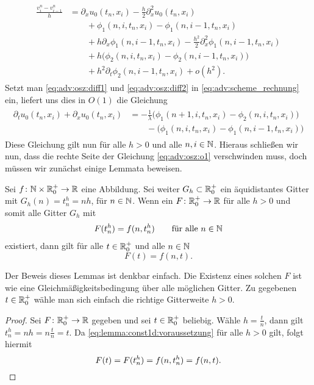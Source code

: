 {\small 
\begin{align} \label{eq:adv:osz:diff2}
\begin{split}
\frac {v^n_i - v^n_{i-1}} h 
&= \partial_x u_0(t_n, x_i) - \frac {h}{2} \partial^2_x u_0(t_n, x_i)\\
&\qquad + \phi_1(n, i, t_n, x_i) - \phi_1(n, i-1, t_n, x_i)\\
&\qquad + h \partial_x \phi_1(n, i-1, t_n, x_i) - \frac {h^2}{2} \partial^2_x \phi_1(n, i-1, t_n, x_i)\\
&\qquad + h \bigl( \phi_2(n, i, t_n, x_i) - \phi_2(n, i-1, t_n, x_i) \bigr)\\
&\qquad + h^2 \partial_t \phi_2(n, i-1, t_n, x_i) + o(h^2).
\end{split}
\end{align}
}
Setzt man \eqref{eq:adv:osz:diff1} und \eqref{eq:adv:osz:diff2} in \eqref{eq:adv:scheme_rechnung} ein, liefert uns dies in $O(1)$ die Gleichung
\begin{align}\label{eq:adv:osz:o1}
\begin{split}
\partial_t u_0(t_n, x_i) + \partial_x u_0(t_n, x_i) &= - \frac 1 \lambda \bigl( \phi_1(n+1, i, t_n, x_i) - \phi_2(n, i, t_n, x_i) \bigr)\\
&\qquad - \bigl(\phi_1(n, i, t_n, x_i) - \phi_1(n, i-1, t_n, x_i) \bigr)
\end{split}
\end{align}
Diese Gleichung gilt nun für alle $h > 0$ und alle $n, i \in \mathbb N$.
Hieraus schließen wir nun, dass die rechte Seite der Gleichung \eqref{eq:adv:osz:o1} verschwinden muss, doch müssen wir zunächst einige Lemmata beweisen.

\begin{lemma} \label{lem:adv:konstant1}
Sei $f\colon \mathbb N \times \mathbb R^+_0 \to \mathbb R$ eine Abbildung.
Sei weiter $G_h \subset \mathbb R^+_0$ ein äquidistantes Gitter mit $G_h(n) = t^h_n = n h$, für $n \in \mathbb N$.
Wenn ein $F\colon \mathbb R^+_0 \to \mathbb R$ für alle $h > 0$ und somit alle Gitter $G_h$ mit
\begin{align}\label{eq:lemma:const1d:voraussetzung}
F(t^h_n) = f(n, t^h_n) \qquad \text{für alle $n \in \mathbb N$}
\end{align}
existiert, dann gilt für alle $t \in \mathbb R^+_0$ und alle $n \in \mathbb N$
\[ F(t) = f(n, t). \]
\end{lemma}
Der Beweis dieses Lemmas ist denkbar einfach. Die Existenz eines solchen $F$ ist wie eine Gleichmäßigkeitsbedingung über alle möglichen Gitter.
Zu gegebenen $t \in \mathbb R^+_0$ wähle man sich einfach die richtige Gitterweite $h > 0$.
\begin{proof}
Sei $F\colon \mathbb R^+_0 \to \mathbb R$ gegeben und sei $t \in \mathbb R^+_0$ beliebig.
Wähle $h = \frac{t}{n}$, dann gilt $t^h_n = nh = n \frac{t}{n} = t$.
Da \eqref{eq:lemma:const1d:voraussetzung} für alle $h > 0$ gilt, folgt hiermit 
\[ F(t) = F(t^h_n) = f(n, t^h_n) = f(n, t). \qedhere \]
\end{proof}

